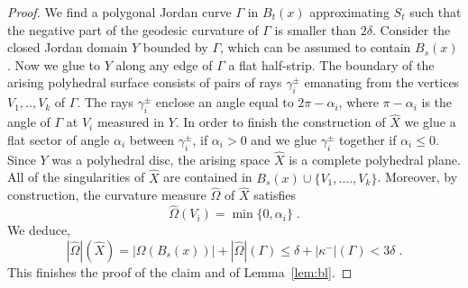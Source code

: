 \documentclass[12pt,leqno]{amsart}
\numberwithin{equation}{section}
\theoremstyle{definition}
\theoremstyle{remark}
\newcommand{\lref}[1]{Lemma~\ref{#1}}
\begin{document}
\begin{proof}
We find a polygonal Jordan curve $\Gamma$ in $B_t(x)$  approximating $S_t$  such that the negative part of the geodesic curvature of $\Gamma$ is smaller than $2\delta$.  Consider the closed Jordan domain  $Y$ bounded by $\Gamma$, which can be assumed to contain $B_s(x)$.
Now we glue to $Y$ along any edge of $\Gamma$ a flat half-strip.  The boundary of the arising polyhedral surface  consists of pairs of rays
$\gamma _i ^{\pm}$  emanating from the vertices $V_1,..,V_k$ of $\Gamma$. The rays $\gamma _i^{\pm}$ enclose an angle equal to $2\pi- \alpha _i$, where $\pi-\alpha _i$ is the angle of $\Gamma$ at $V_i$ measured in $Y$.   In order to finish the construction of $\hat X$ we glue  a flat sector of
angle $\alpha _i$ between $\gamma _i ^{\pm}$, if $\alpha _i >0$ and we glue $\gamma _i^{\pm}$ together if $\alpha _i \leq 0$.
Since $Y$ was a polyhedral disc, the arising space $\hat X$ is a complete polyhedral plane.
 All of the singularities of $\hat X$  are contained in $B_s(x) \cup \{ V_1,...., V_k\}$. Moreover, by construction, the curvature measure
   $\hat \Omega$ of $\hat X$ satisfies
   $$\hat \Omega  (V_i) = \min \{ 0, \alpha _i \} \;.$$
  We deduce,
  $$|\hat \Omega | ( \hat X) = |\Omega (B_s (x))| + |\hat \Omega | ( \Gamma ) \leq \delta  + |\kappa ^-| (\Gamma ) < 3 \delta \;.$$
    This finishes the proof of the claim and of \lref{lem:bl}.
\end{proof}
\end{document}
